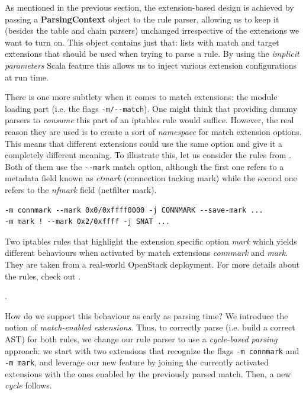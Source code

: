 As mentioned in the previous section, the extension-based design is achieved by
passing a \textbf{ParsingContext} object to the rule parser, allowing us to
keep it (besides the table and chain parsers) unchanged irrespective of the
extensions we want to turn on.  This object contains just that: lists with
match and target extensions that should be used when trying to parse a rule.
By using the \emph{implicit parameters} Scala feature this allows us to inject
various extension configurations at run time.

There is one more subtlety when it comes to match extensions: the module
loading part (i.e. the flags \lstinline{-m/--match}).  One might think that
providing dummy parsers to \emph{consume} this part of an iptables rule would
suffice.  However, the real reason they are used is to create a sort of
\emph{namespace} for match extension options.  This means that different
extensions could use the same option and give it a completely different
meaning.  To illustrate this, let us consider the rules from
.  Both of them use the
\lstinline{--mark} match option, although the first one refers to a metadata
field known as \emph{ctmark} (connection tacking mark) while the second one
refers to the \emph{nfmark} field (netfilter mark).

\begin{listing}
  \lstset{numbers=none, frame=single, basicstyle=\ttfamily,
    xleftmargin=0.05\textwidth, xrightmargin=0.05\textwidth
  }
  \small
  \begin{lstlisting}
-m connmark --mark 0x0/0xffff0000 -j CONNMARK --save-mark ...
-m mark ! --mark 0x2/0xffff -j SNAT ...
  \end{lstlisting}
  \caption{Two iptables rules that highlight the extension specific option
  \emph{mark} which yields different behaviours when activated by match
  extensions \emph{connmark} and \emph{mark}.  They are taken from a real-world
  OpenStack deployment.  For more details about the rules, check out
  .}.
  \label{lst:namespace-example}
\end{listing}

How do we support this behaviour as early as parsing time?  We introduce the
notion of \emph{match-enabled extensions}.  Thus, to correctly parse (i.e.
build a correct AST) for both rules, we change our rule parser to use a
\emph{cycle-based parsing} approach: we start with two extensions that
recognize the flags \lstinline{-m connmark} and \lstinline{-m mark}, and
leverage our new feature by joining the currently activated extensions with the
ones enabled by the previously parsed match.  Then, a new \emph{cycle} follows.

